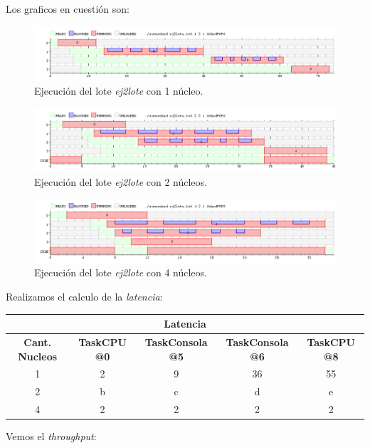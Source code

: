 Los graficos en cuestión son:

\begin{figure}[!h]
	\begin{center}
		\includegraphics[width=500px]{imagenes/ej2_1.png}
		\caption{Ejecución del lote \emph{ej2lote} con 1 núcleo.}
		\label{fig:grafico_ej2_1}
	\end{center}
\end{figure}

\begin{figure}[!h]
	\begin{center}
		\includegraphics[width=500px]{imagenes/ej2_2.png}
		\caption{Ejecución del lote \emph{ej2lote} con 2 núcleos.}
		\label{fig:grafico_ej2_2}
	\end{center}
\end{figure}

\begin{figure}[!h]
	\begin{center}
		\includegraphics[width=500px]{imagenes/ej2_4.png}
		\caption{Ejecución del lote \emph{ej2lote} con 4 núcleos.}
		\label{fig:grafico_ej2_4}
	\end{center}
\end{figure}

\newpage
Realizamos el calculo de la \textit{latencia}:

\begin{center}
	\begin{tabular}{|c|c|c|c|c|}
		\hline
		\multicolumn{5}{|c|}{\textbf{Latencia}} \\
		\hline
		\textbf{Cant. Nucleos} & \textbf{TaskCPU @0} & \textbf{TaskConsola @5} & \textbf{TaskConsola @6} & \textbf{TaskCPU @8} \\
		\hline
		1 & 2 & 9 & 36 & 55 \\
		2 & b & c & d & e \\
		4 & 2 & 2 & 2 & 2 \\
		\hline
	\end{tabular}
\end{center}

Vemos el \textit{throughput}: